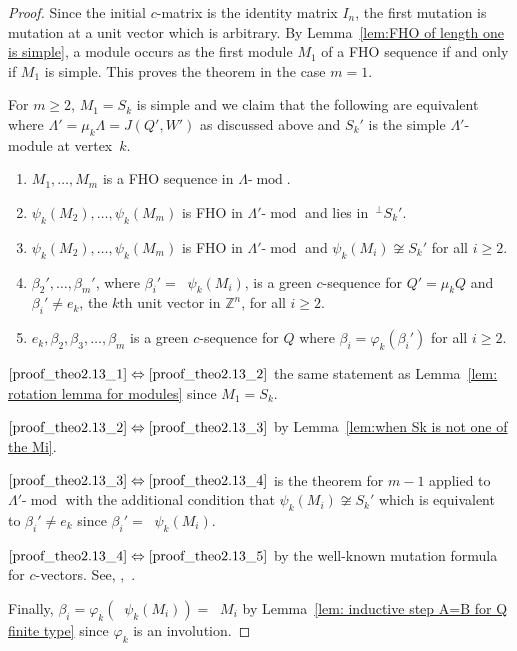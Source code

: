 \documentclass[ALCO,ThmDefs,Unicode,epreuves]{cedram}
\newcommand{\ifff}{\Leftrightarrow}
\DeclareMathOperator{\undim}{\underline{dim}}
\DeclareMathOperator{\modr}{mod}
\newcommand{\field}[1]{\mathbb{#1}}
\newcommand{\ZZ}{\ensuremath{{\field{Z}}}}
\begin{document}
\begin{proof} Since the initial $c$-matrix is the identity matrix $I_n$, the first mutation is mutation at a unit vector which is arbitrary. By Lemma~\ref{lem:FHO of length one is simple}, a module occurs as the first module $M_1$ of a FHO sequence if and only if $M_1$ is simple. This proves the theorem in the case $m=1$.

For $m\ge2$, $M_1=S_k$ is simple and we claim that the following are equivalent where $\Lambda'=\mu_k\Lambda=J(Q',W')$ as discussed above and $S_k'$ is the simple $\Lambda'$-module at vertex~$k$.
\begin{enumerate}
\item\label{proof_theo2.13_1} $M_1,\ldots,M_m$ is a FHO sequence in $\Lambda\text{-}\modr $.
\item\label{proof_theo2.13_2} $\psi_k(M_2),\ldots,\psi_k(M_m)$ is FHO in $\Lambda'\text{-}\modr $ and lies in $\,^\perp S_k'$.
\item\label{proof_theo2.13_3} $\psi_k(M_2),\ldots,\psi_k(M_m)$ is FHO in $\Lambda'\text{-}\modr $ and $\psi_k(M_i)\not\cong S_k'$ for all $i\ge2$.
\item\label{proof_theo2.13_4} $\beta_2',\ldots,\beta_m'$, where $\beta_i'=\undim \psi_k(M_i)$, is a green $c$-sequence for $Q'=\mu_kQ$ and $\beta_i'\neq e_k$, the $k$th unit vector in $\ZZ^n$, for all $i\ge2$.
\item\label{proof_theo2.13_5} $e_k,\beta_2,\beta_3,\ldots,\beta_m$ is a green $c$-sequence for $Q$ where $\beta_i=\varphi_k(\beta_i')$ for all $i\ge2$.
\end{enumerate}
$\eqref{proof_theo2.13_1}\ifff\eqref{proof_theo2.13_2}$ the same statement as Lemma~\ref{lem: rotation lemma for modules} since $M_1=S_k$.

\noindent$\eqref{proof_theo2.13_2}\ifff\eqref{proof_theo2.13_3}$ by Lemma~\ref{lem:when Sk is not one of the Mi}.

\noindent$\eqref{proof_theo2.13_3}\ifff\eqref{proof_theo2.13_4}$ is the theorem for $m-1$ applied to $\Lambda'\text{-}\modr $ with the additional condition that $\psi_k(M_i)\not\cong S_k'$ which is equivalent to $\beta_i'\neq e_k$ since $\beta_i'=\undim\psi_k(M_i)$.

\noindent$\eqref{proof_theo2.13_4}\ifff\eqref{proof_theo2.13_5}$ by the well-known mutation formula for $c$-vectors. See, \eg ,~\cite[Thm~2.1.8]{BHIT}.

Finally, $\beta_i=\varphi_k(\undim \psi_k(M_i))=\undim M_i$ by Lemma~\ref{lem: inductive step A=B for Q finite type} since $\varphi_k$ is an involution. \end{proof}
\end{document}
